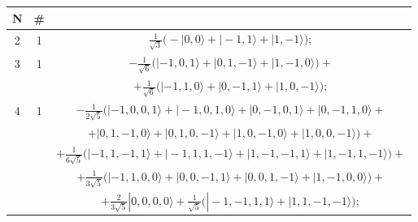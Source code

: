 \documentclass[rmp,amsfonts,showpacs,showkeys,preprint]{revtex4}
\begin{document}
\begin{table}
\begin{tabular}{ccc}
\hline\hline
N & \# & \\
\hline\hline
2&1&$\frac{1}{{\sqrt{3}}}\big(-|0,0\rangle+|-1,1\rangle+|1,-1\rangle\big);$\\\hline


3&1&$
-\frac{1}{{\sqrt{6}}}\big(|-1,0,1\rangle+|0,1,-1\rangle+|1,-1,0\rangle\big)+$\\&&$
+\frac{1}{{\sqrt{6}}}\big(|-1,1,0\rangle+|0,-1,1\rangle+|1,0,-1\rangle\big);$\\\hline

4&1&$ -\frac{1}{2 {\sqrt{5}}}\big(|-1,0,0,1\rangle+
|-1,0,1,0\rangle+|0,-1,0,1\rangle+
|0,-1,1,0\rangle+$\\&&$+|0,1,-1,0\rangle+
|0,1,0,-1\rangle+|1,0,-1,0\rangle+
|1,0,0,-1\rangle\big)+$\\&&$+\frac{1}{6
{\sqrt{5}}}\big(|-1,1,-1,1\rangle+
|-1,1,1,-1\rangle+|1,-1,-1,1\rangle+
|1,-1,1,-1\rangle\big)+$\\&&$+\frac{1}{3
{\sqrt{5}}}\big(|-1,1,0,0\rangle+
|0,0,-1,1\rangle+|0,0,1,-1\rangle+
|1,-1,0,0\rangle\big)+$\\&&$+\frac{2}{3
{\sqrt{5}}}|0,0,0,0\rangle+
\frac{1}{{\sqrt{5}}}\big(|-1,-1,1,1\rangle+|1,1,-1,-1\rangle\big);$\\


\end{tabular}
\end{table}
\end{document}
